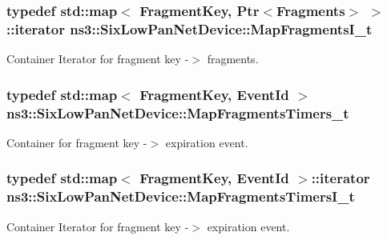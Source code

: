 \subsubsection[{\texorpdfstring{Map\+Fragments\+I\+\_\+t}{MapFragmentsI_t}}]{\setlength{\rightskip}{0pt plus 5cm}typedef std\+::map$<$ {\bf Fragment\+Key}, {\bf Ptr}$<${\bf Fragments}$>$ $>$\+::iterator {\bf ns3\+::\+Six\+Low\+Pan\+Net\+Device\+::\+Map\+Fragments\+I\+\_\+t}\hspace{0.3cm}{\ttfamily [private]}}\hypertarget{classns3_1_1SixLowPanNetDevice_a3705ab28794ee87035b79632b7657603}{}\label{classns3_1_1SixLowPanNetDevice_a3705ab28794ee87035b79632b7657603}
Container Iterator for fragment key -\/$>$ fragments. 
\subsubsection[{\texorpdfstring{Map\+Fragments\+Timers\+\_\+t}{MapFragmentsTimers_t}}]{\setlength{\rightskip}{0pt plus 5cm}typedef std\+::map$<$ {\bf Fragment\+Key}, {\bf Event\+Id} $>$ {\bf ns3\+::\+Six\+Low\+Pan\+Net\+Device\+::\+Map\+Fragments\+Timers\+\_\+t}\hspace{0.3cm}{\ttfamily [private]}}\hypertarget{classns3_1_1SixLowPanNetDevice_a18f45002cd987a2b49d9c155e21d99b7}{}\label{classns3_1_1SixLowPanNetDevice_a18f45002cd987a2b49d9c155e21d99b7}
Container for fragment key -\/$>$ expiration event. 
\subsubsection[{\texorpdfstring{Map\+Fragments\+Timers\+I\+\_\+t}{MapFragmentsTimersI_t}}]{\setlength{\rightskip}{0pt plus 5cm}typedef std\+::map$<$ {\bf Fragment\+Key}, {\bf Event\+Id} $>$\+::iterator {\bf ns3\+::\+Six\+Low\+Pan\+Net\+Device\+::\+Map\+Fragments\+Timers\+I\+\_\+t}\hspace{0.3cm}{\ttfamily [private]}}\hypertarget{classns3_1_1SixLowPanNetDevice_a13a491d7e33f4ffa15205baf6d393ec1}{}\label{classns3_1_1SixLowPanNetDevice_a13a491d7e33f4ffa15205baf6d393ec1}
Container Iterator for fragment key -\/$>$ expiration event. 
